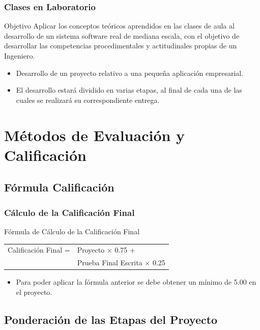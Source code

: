 \documentclass[a4paper,t,xcolor=pst,dvips,colortheme]{beamer}
\begin{document}
\begin{frame}
	\frametitle{Clases en Laboratorio}
	\begin{block}{Objetivo}
        Aplicar los conceptos teóricos aprendidos en las clases de aula al desarrollo de un sistema software real de mediana escala, con el objetivo de desarrollar las competencias procedimentales y actitudinales propias de un Ingeniero.
	\end{block}
	\begin{itemize}
        \item<2-> Desarrollo de un proyecto relativo a una pequeña aplicación empresarial.
        \item<3-> El desarrollo estará dividido en varias etapas, al final de cada una de las cuales se realizará su correspondiente entrega.
	\end{itemize}
\end{frame}

\section{Métodos de Evaluación y Calificación}

\subsection{Fórmula Calificación}

\begin{frame}[c]
	\frametitle{Cálculo de la Calificación Final}
	\begin{block}{Fórmula de Cálculo de la Calificación Final}
		\begin{center}
        \begin{tabular}{ll}
			Calificación  Final  =  & Proyecto $\times$ 0.75 + \\
                                    & Prueba  Final  Escrita $\times$ 0.25 \\
		\end{tabular}
        \end{center}
	\end{block}
	\begin{itemize}
		\item<2-> Para poder aplicar la fórmula anterior se debe obtener un mínimo de 5.00 en el proyecto.
	\end{itemize}
\end{frame}

\subsection{Ponderación de las Etapas del Proyecto}
\end{document}

